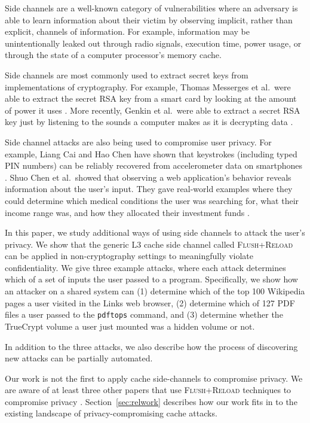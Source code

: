 \documentclass[letterpaper,twocolumn,10pt]{article}
\begin{document}
Side channels are a well-known category of vulnerabilities where an adversary is
able to learn information about their victim by observing implicit, rather than
explicit, channels of information. For example, information may be
unintentionally leaked out through radio signals, execution time, power usage,
or through the state of a computer processor's memory cache.

Side channels are most commonly used to extract secret keys from implementations
of cryptography. For example, Thomas Messerges et al.\ were able to extract the
secret RSA key from a smart card by looking at the amount of power it uses
\cite{messerges1999power}. More recently, Genkin et al.\ were able to extract
a secret RSA key just by listening to the sounds a computer makes as it is
decrypting data \cite{genkin2013rsa}. 

Side channel attacks are also being used to compromise user privacy. For
example, Liang Cai and Hao Chen have shown that keystrokes (including typed PIN
numbers) can be reliably recovered from accelerometer data on smartphones
\cite{cai2012practicality}. Shuo Chen et al.\ showed that observing a web
application's behavior reveals information about the user's input. They gave
real-world examples where they could determine which medical conditions the user
was searching for, what their income range was, and how they allocated their
investment funds \cite{chen2010side}.

In this paper, we study additional ways of using side channels to attack the
user's privacy. We show that the generic L3 cache side channel called
\textsc{Flush+Reload} \cite{yarom2013flush} can be applied in non-cryptography
settings to meaningfully violate confidentiality. We give three example attacks, where
each attack determines which of a set of inputs the user passed to a program.
Specifically, we show how an attacker on a shared system can (1) determine which
of the top 100 Wikipedia pages a user visited in the Links web browser, (2)
determine which of 127 PDF files a user passed to the \texttt{pdftops} command,
and (3) determine whether the TrueCrypt volume a user just mounted was a hidden
volume or not.

In addition to the three attacks, we also describe how the process of
discovering new attacks can be partially automated.

Our work is not the first to apply cache side-channels to compromise privacy. We
are aware of at least three other papers that use \textsc{Flush+Reload}
techniques to compromise privacy \cite{gruss2015cache, zhang2014cross,
oren2015spy}. Section~\ref{sec:relwork} describes how our work fits in to the
existing landscape of privacy-compromising cache attacks.
\end{document}
